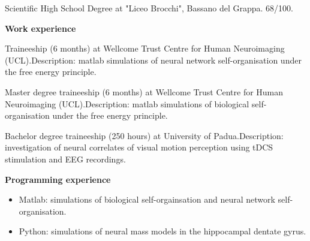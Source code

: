 \documentclass[11pt,usenames, dvipsnames]{article}
\begin{document}
 Scientific High School Degree at "Liceo Brocchi", Bassano del Grappa. 68/100. 

\vspace{1cm}

{\large \bfseries Work experience}\newline
\vspace{-2pt}

 Traineeship (6 months) at Wellcome Trust Centre for Human Neuroimaging (UCL).\newline Description: matlab simulations of neural network self-organisation under the free energy principle.\newline
\vspace{5pt}

 Master degree traineeship (6 months) at Wellcome Trust Centre for Human Neuroimaging (UCL).\newline Description: matlab simulations of biological self-organisation under the free energy principle.\newline

\vspace{5pt}

 Bachelor degree traineeship (250 hours) at University of Padua.\newline Description: investigation of neural correlates of visual motion perception using tDCS stimulation and EEG recordings.\newline

\vspace{1cm}
\newpage
{\large \bfseries Programming experience}
\begin{itemize}
\item Matlab: simulations of biological self-orgainsation and neural network self-organisation.
\item Python: simulations of neural mass models in the hippocampal dentate gyrus.  
\end{itemize}

\vspace{.9cm}
\end{document}
